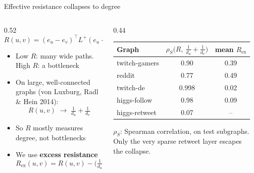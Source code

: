 \documentclass[aspectratio=169,10pt]{beamer}
\newcommand{\snote}[1]{{\scriptsize\textcolor{ink!70}{#1}}}
\begin{document}
\begin{frame}{Effective resistance collapses to degree}
  \begin{columns}[T]
    \begin{column}{0.52\textwidth}
      \[ R(u,v) = (e_u - e_v)^\top L^+ (e_u - e_v) \]
      \begin{itemize}\small
        \item Low $R$: many wide paths. High $R$: a bottleneck
        \item On large, well-connected graphs \snote{(von Luxburg, Radl \& Hein 2014)}:
          \[ R(u,v) \;\to\; \tfrac{1}{d_u} + \tfrac{1}{d_v} \]
        \item So $R$ mostly measures \alert{degree}, not bottlenecks
        \item We use \textbf{excess resistance}
          \[ R_{\text{ex}}(u,v) = R(u,v) - \big(\tfrac{1}{d_u} + \tfrac{1}{d_v}\big) \]
      \end{itemize}
    \end{column}
    \begin{column}{0.44\textwidth}
      \centering\small
      \begin{tabular}{@{}lcc@{}}
        \toprule
        Graph & $\rho_S\big(R,\ \tfrac1{d_u}{+}\tfrac1{d_v}\big)$ & mean $R_{\text{ex}}$ \\
        \midrule
        twitch-gamers & 0.90 & 0.39 \\
        reddit & 0.77 & 0.49 \\
        twitch-de & \alert{0.998} & 0.02 \\
        higgs-follow & \alert{0.98} & 0.09 \\
        higgs-retweet & 0.07 & -- \\
        \bottomrule
      \end{tabular}

      \snote{$\rho_S$: Spearman correlation, on test subgraphs. Only the very sparse retweet layer escapes the collapse.}
    \end{column}
  \end{columns}
\end{frame}
\end{document}
